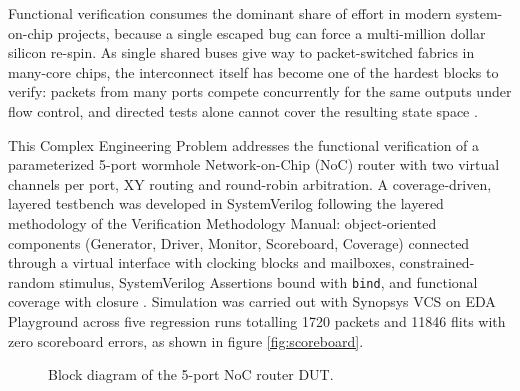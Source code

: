 \documentclass[11pt,a4paper]{report}  %
\begin{document}
Functional verification consumes the dominant share of effort in modern
system-on-chip projects, because a single escaped bug can force a multi-million
dollar silicon re-spin. As single shared buses give way to packet-switched
fabrics in many-core chips, the interconnect itself has become one of the
hardest blocks to verify: packets from many ports compete concurrently for the
same outputs under flow control, and directed tests alone cannot cover the
resulting state space \cite{Bergeron}\cite{Spear}.

This Complex Engineering Problem addresses the functional verification of a
parameterized 5-port wormhole Network-on-Chip (NoC) router with two virtual
channels per port, XY routing and round-robin arbitration. A coverage-driven,
layered testbench was developed in SystemVerilog following the layered
methodology of the Verification Methodology Manual: object-oriented components
(Generator, Driver, Monitor, Scoreboard, Coverage) connected through a virtual
interface with clocking blocks and mailboxes, constrained-random stimulus,
SystemVerilog Assertions bound with \texttt{bind}, and functional coverage with
closure \cite{Spear}\cite{UVM}. Simulation was carried out with Synopsys VCS on
EDA Playground across five regression runs totalling 1720 packets and 11846
flits with zero scoreboard errors, as shown in figure \ref{fig:scoreboard}.

\begin{figure}[h!]
    \centering
    \caption{Block diagram of the 5-port NoC router DUT.}
    \label{fig:dut}
\end{figure}
\end{document}
